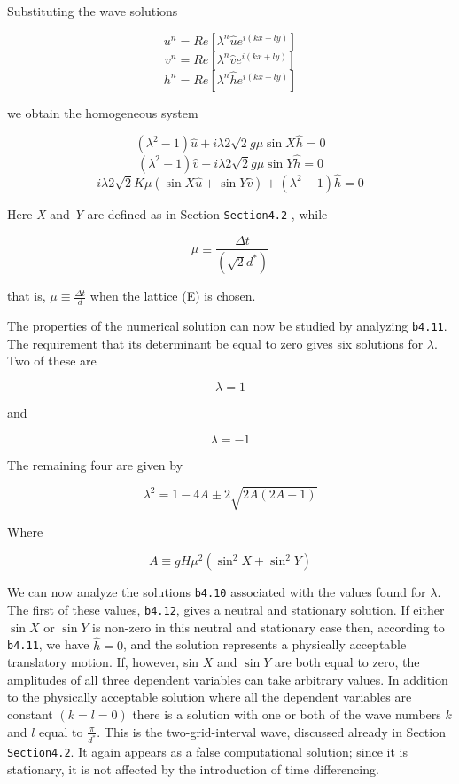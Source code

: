 Substituting the wave solutions

{\[u^n = Re \left[ \lambda^n \widehat{u} e^{i(kx+ly)} \right]\]\[v^n = Re \left[ \lambda^n \widehat{v} e^{i(kx+ly)} \right]\]\[h^n = Re \left[ \lambda^n \widehat{h} e^{i(kx+ly)} \right]\]}

we obtain the homogeneous system

{\[\left( \lambda^{2} - 1 \right)\widehat{u} + i\lambda 2\sqrt{2}g\mu \sin{X}\widehat{h} = 0\]\[\left( \lambda^{2} - 1 \right)\widehat{v} + i\lambda 2\sqrt{2}g\mu \sin{Y}\widehat{h} = 0\]\[i\lambda 2\sqrt{2}K\mu \left( \sin{X}\widehat{u} + \sin{Y}\widehat{v} \right) + \left( \lambda^{2} - 1 \right)\widehat{h} = 0\]}

Here \emph{X} and \emph{Y} are defined as in Section \texttt{Section4.2}
, while

\[\mu \equiv \frac{\Delta t}{\left( \sqrt{2}d^{*} \right)}\]

that is, \(\mu \equiv \frac{\Delta t}{d}\) when the lattice (E) is
chosen.

The properties of the numerical solution can now be studied by analyzing
\texttt{b4.11}. The requirement that its determinant be equal to zero
gives six solutions for \(\lambda\). Two of these are

{\[\lambda = 1\]}

and

{\[\lambda = - 1\]}

The remaining four are given by

{\[\lambda^{2} = 1 - 4A \pm 2\sqrt{2A( 2A - 1 )}\]}

Where

\[A \equiv gH\mu^{2}\left( \sin^{2}X + \sin^{2}Y \right)\]

We can now analyze the solutions \texttt{b4.10} associated with the
values found for \(\lambda\). The first of these values, \texttt{b4.12},
gives a neutral and stationary solution. If either \(\sin{X}\) or
\(\sin{Y}\) is non-zero in this neutral and stationary case then,
according to \texttt{b4.11}, we have \(\widehat{h} = 0\), and the
solution represents a physically acceptable translatory motion. If,
however, sin \(X\) and \(\sin{Y}\) are both equal to zero, the
amplitudes of all three dependent variables can take arbitrary values.
In addition to the physically acceptable solution where all the
dependent variables are constant \(\left( k = l = 0 \right)\) there is a
solution with one or both of the wave numbers \(k\) and \(l\) equal to
\(\frac{\pi}{d^{*}}\). This is the two-grid-interval wave, discussed
already in Section \texttt{Section4.2}. It again appears as a false
computational solution; since it is stationary, it is not affected by
the introduction of time differencing.

